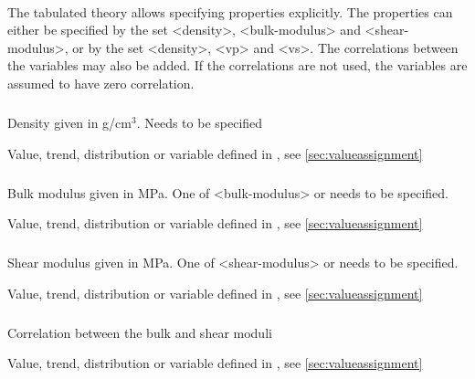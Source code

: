 {\paragraph{}
 \slist
   \item \Description The tabulated theory allows specifying properties explicitly. The properties can either be specified by the set <density>, <bulk-modulus> and <shear-modulus>, or by the set <density>, <vp> and <vs>. The correlations between the variables may also be added. If the correlations are not used, the variables are assumed to have zero correlation.
   \item \Argument
   \item \Default
 \elist

\subparagraph{}
 \slist
   \item \Description Density given in g/cm$^3$. Needs to be specified
   \item \Argument Value, trend, distribution or variable defined in , see \autoref{sec:valueassignment}
   \item \Default
 \elist

\subparagraph{}
 \slist
   \item \Description Bulk modulus given in MPa. One of <bulk-modulus> or  needs to be specified.
   \item \Argument Value, trend, distribution or variable defined in , see \autoref{sec:valueassignment}
   \item \Default
 \elist

\subparagraph{}
 \slist
   \item \Description Shear modulus given in MPa. One of <shear-modulus> or  needs to be specified.
   \item \Argument Value, trend, distribution or variable defined in , see \autoref{sec:valueassignment}
   \item \Default
 \elist

\subparagraph{}
 \slist
   \item \Description Correlation between the bulk and shear moduli
   \item \Argument Value, trend, distribution or variable defined in , see \autoref{sec:valueassignment}
   \item {}
 \elist

}
